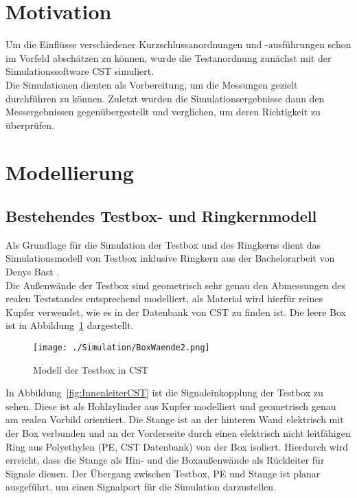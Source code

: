     \section{Motivation}
    Um die Einflüsse verschiedener Kurzschlussanordnungen und -ausführungen schon im Vorfeld abschätzen zu können, wurde die Testanordnung zunächst mit der Simulationssoftware CST simuliert.\\
    Die Simulationen dienten als Vorbereitung, um die Messungen gezielt durchführen zu können. Zuletzt wurden die Simulationsergebnisse dann den Messergebnissen gegenübergestellt und verglichen, um deren Richtigkeit zu überprüfen.
    
    \section{Modellierung}
        \subsection{Bestehendes Testbox- und Ringkernmodell}
        Als Grundlage für die Simulation der Testbox und des Ringkerns dient das Simulationsmodell von Testbox inklusive Ringkern aus der Bachelorarbeit von Denys Bast \citep{bast2017ba}.\\
        Die Außenwände der Testbox sind geometrisch sehr genau den Abmessungen des realen Teststandes entsprechend modelliert, als Material wird hierfür reines Kupfer verwendet, wie es in der Datenbank von CST zu finden ist. Die leere Box ist in Abbildung~\ref{fig:BoxCST} dargestellt.
        
            \begin{figure}[htb]
                \centering
                \texttt{[image: ./Simulation/BoxWaende2.png]}
                \caption{Modell der Testbox in CST}
                \label{fig:BoxCST}
            \end{figure}
        In Abbildung~\ref{fig:InnenleiterCST} ist die Signaleinkopplung der Testbox zu sehen.
        Diese ist als Hohlzylinder aus Kupfer modelliert und geometrisch genau am realen Vorbild orientiert. Die Stange ist an der hinteren Wand elektrisch mit der Box verbunden und an der Vorderseite durch einen elektrisch nicht leitfähigen Ring aus Polyethylen (PE, CST Datenbank) von der Box isoliert. Hierdurch wird erreicht, dass die Stange als Hin- und die Boxaußenwände als Rückleiter für Signale dienen. Der Übergang zwischen Testbox, PE und Stange ist planar ausgeführt, um einen Signalport für die Simulation darzustellen.
        
